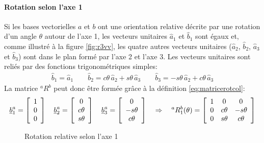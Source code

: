 \paragraph{Rotation selon l'axe 1}
%
Si les bases vectorielles $a$ et $b$ ont une orientation relative décrite par une rotation d'un angle $\theta$ autour de l'axe 1, les vecteurs unitaires $\hat{a}_1$ et $\hat{b}_1$ sont égaux et, comme illustré à la figure \ref{fig:r3vv}, les quatre autres vecteurs unitaires ($\hat{a}_2$, $\hat{b}_2$, $\hat{a}_3$ et $\hat{b}_3$) sont dans le plan formé par l'axe 2 et l'axe 3. Les vecteurs unitaires sont reliés par des fonctions trigonométriques simples: 
\begin{align}
\hat{b}_1 = \hat{a}_1 \quad\quad
\hat{b}_2 = c\theta \, \hat{a}_2 + s\theta \, \hat{a}_3 \quad\quad
\hat{b}_3 = -s\theta \, \hat{a}_2 + c\theta \, \hat{a}_3
\label{eq:rot1vecuni}
\end{align}
La matrice $^aR^b$ peut donc être formée grâce à la définition \eqref{eq:matricerotcol}:
\begin{align}
\underline{b}_1^a = \left[ \begin{array}{c} 1 \\ 0 \\ 0  \end{array} \right] \quad
\underline{b}_2^a = \left[ \begin{array}{c} 0 \\ c\theta \\ s\theta  \end{array} \right] \quad
\underline{b}_3^a = \left[ \begin{array}{c} 0 \\ -s\theta \\ c\theta  \end{array} \right]
\quad \Rightarrow \quad
^aR^b_1(\theta) 
= \left[ \begin{array}{c c c}
	1 & 0 & 0 \\
	0 & c\theta  & -s\theta \\
	0 & s\theta & c\theta 
\end{array}  \right]
\label{eq:rot1theta}
\end{align}
%
\begin{figure}[H]
        \centering
				\hspace{+20pt}
        \caption{Rotation relative selon l'axe 1}
				\label{fig:r1vv}
\end{figure}


